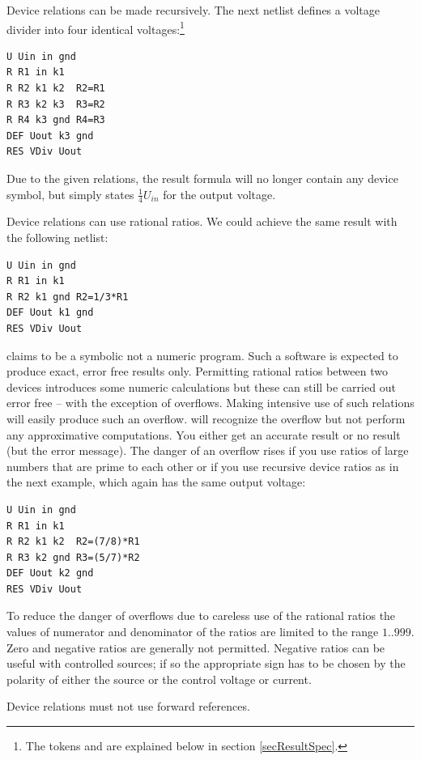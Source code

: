 Device relations can be made recursively. The next netlist defines a
voltage divider into four identical voltages:\footnote{The tokens
 and  are explained below in section
\ref{secResultSpec}.}

\begin{verbatim}
U Uin in gnd
R R1 in k1
R R2 k1 k2  R2=R1
R R3 k2 k3  R3=R2
R R4 k3 gnd R4=R3
DEF Uout k3 gnd
RES VDiv Uout
\end{verbatim}

Due to the given relations, the result formula will no longer contain any
device symbol, but simply states $\frac{1}{4}U_{in}$ for the output
voltage.

Device relations can use rational ratios. We could achieve the same result
with the following netlist:

\begin{verbatim}
U Uin in gnd
R R1 in k1
R R2 k1 gnd R2=1/3*R1
DEF Uout k1 gnd
RES VDiv Uout
\end{verbatim}

\linnet{} claims to be a symbolic not a numeric program. Such a software
is expected to produce exact, error free results only. Permitting rational
ratios between two devices introduces some numeric calculations but these
can still be carried out error free -- with the exception of overflows.
Making intensive use of such relations will easily produce such an
overflow. \linnet{} will recognize the overflow but not perform any
approximative computations. You either get an accurate result or no result
(but the error message). The danger of an overflow rises if you use ratios
of large numbers that are prime to each other or if you use recursive
device ratios as in the next example, which again has the same output
voltage:

\begin{verbatim}
U Uin in gnd
R R1 in k1
R R2 k1 k2  R2=(7/8)*R1
R R3 k2 gnd R3=(5/7)*R2
DEF Uout k2 gnd
RES VDiv Uout
\end{verbatim}

\noindent
To reduce the danger of overflows due to careless use of the rational
ratios the values of numerator and denominator of the ratios are limited
to the range $1..999$. Zero and negative ratios are generally not
permitted. Negative ratios can be useful with controlled sources; if so
the appropriate sign has to be chosen by the polarity of either the source
or the control voltage or current.

Device relations must not use forward references. 


